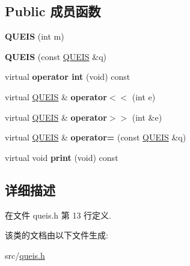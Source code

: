 \subsection*{Public 成员函数}
\begin{DoxyCompactItemize}
\item 
{\bfseries Q\+U\+E\+IS} (int m)\hypertarget{classQUEIS_a8eb66c1ff47e0f0aca03c563ac6e6dce}{}\label{classQUEIS_a8eb66c1ff47e0f0aca03c563ac6e6dce}

\item 
{\bfseries Q\+U\+E\+IS} (const \hyperlink{classQUEIS}{Q\+U\+E\+IS} \&q)\hypertarget{classQUEIS_ad9d0fe5e4b37f19883c5463173fd8ce6}{}\label{classQUEIS_ad9d0fe5e4b37f19883c5463173fd8ce6}

\item 
virtual {\bfseries operator int} (void) const \hypertarget{classQUEIS_a0cd5f9b0a81ad316af771078ea723873}{}\label{classQUEIS_a0cd5f9b0a81ad316af771078ea723873}

\item 
virtual \hyperlink{classQUEIS}{Q\+U\+E\+IS} \& {\bfseries operator$<$$<$} (int e)\hypertarget{classQUEIS_a6f9891ed65fb0e1127c31d1d9f2e85ee}{}\label{classQUEIS_a6f9891ed65fb0e1127c31d1d9f2e85ee}

\item 
virtual \hyperlink{classQUEIS}{Q\+U\+E\+IS} \& {\bfseries operator$>$$>$} (int \&e)\hypertarget{classQUEIS_acbf52122b69ca035a107cca9f4b73ab2}{}\label{classQUEIS_acbf52122b69ca035a107cca9f4b73ab2}

\item 
virtual \hyperlink{classQUEIS}{Q\+U\+E\+IS} \& {\bfseries operator=} (const \hyperlink{classQUEIS}{Q\+U\+E\+IS} \&q)\hypertarget{classQUEIS_a9b44dfb89316be0158361b642b7d558a}{}\label{classQUEIS_a9b44dfb89316be0158361b642b7d558a}

\item 
virtual void {\bfseries print} (void) const \hypertarget{classQUEIS_a447f31b50d9bea91fc5fc7c7aaffd68a}{}\label{classQUEIS_a447f31b50d9bea91fc5fc7c7aaffd68a}

\end{DoxyCompactItemize}


\subsection{详细描述}


在文件 queis.\+h 第 13 行定义.



该类的文档由以下文件生成\+:\begin{DoxyCompactItemize}
\item 
src/\hyperlink{queis_8h}{queis.\+h}\end{DoxyCompactItemize}
